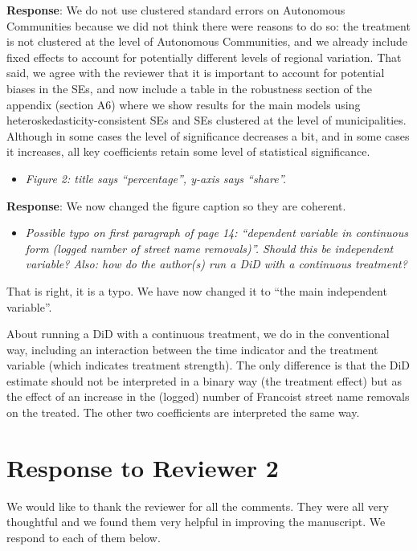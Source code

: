 \documentclass[12pt, a4paper, notitlepage]{article}
\begin{document}
\textbf{Response}: We do not use clustered standard errors on Autonomous Communities because we did not think there were reasons to do so: the treatment is not clustered at the level of Autonomous Communities, and we already include fixed effects to account for potentially different levels of regional variation. That said, we agree with the reviewer that it is important to account for potential biases in the SEs, and now include a table in the robustness section of the appendix (section A6) where we show results for the main models using heteroskedasticity-consistent SEs and SEs clustered at the level of municipalities.
Although in some cases the level of significance decreases a bit, and in some cases it increases, all key coefficients retain some level of statistical significance.

\begin{itemize}
  \item \textit{Figure 2: title says “percentage”, y-axis says “share”.}
\end{itemize}

\textbf{Response}: We now changed the figure caption so they are coherent.

\begin{itemize}
  \item \textit{Possible typo on first paragraph of page 14: “dependent variable in continuous form
  (logged number of street name removals)”. Should this be independent variable? Also: how do the author(s) run a DiD with a continuous treatment?}
\end{itemize}

That is right, it is a typo. We have now changed it to ``the main independent variable''.

About running a DiD with a continuous treatment, we do in the conventional way, including an interaction between the time indicator and the treatment variable (which indicates treatment strength). The only difference is that the DiD estimate should not be interpreted in a binary way (the treatment effect) but as the effect of an increase in the (logged) number of Francoist street name removals on the treated. The other two coefficients are interpreted the same way.

\newpage
\section*{Response to Reviewer 2}

We would like to thank the reviewer for all the comments. They were all very thoughtful and we found them very helpful in improving the manuscript. We respond to each of them below.
\end{document}
